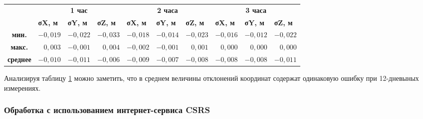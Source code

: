 \begin{table} [htbp]
	\centering\small
	\label{tab:tab08}{%
		\begin{tabular}{|c|rrr|rrr|rrr|}
			\hline
			\multirow{2}{*}{\textbf{ }} & 
			\multicolumn{3}{c|}{\textbf{1 час}}  & \multicolumn{3}{c|}{\textbf{2 часа}}  & \multicolumn{3}{c|}{\textbf{3 часа}}  \\ \cline{2-10} & 
			\multicolumn{1}{l|}{\textbf{σX, м}} & \multicolumn{1}{l|}{\textbf{σY, м}} & \multicolumn{1}{l|}{\textbf{σZ, м}} & \multicolumn{1}{l|}{\textbf{σX, м}} & \multicolumn{1}{l|}{\textbf{σY, м}} & \multicolumn{1}{l|}{\textbf{σZ, м}} & \multicolumn{1}{l|}{\textbf{σX, м}} & \multicolumn{1}{l|}{\textbf{σY, м}} & \multicolumn{1}{l|}{\textbf{σZ, м}} \\ \hline
			\textbf{мин.}                       & \multicolumn{1}{r|}{$-0,019$}       & \multicolumn{1}{r|}{$-0,022$}         & $-0,033$                            & \multicolumn{1}{r|}{$-0,018$}       & \multicolumn{1}{r|}{$-0,014$}         & $-0,023$                            & \multicolumn{1}{r|}{$-0,016$}       & \multicolumn{1}{r|}{$-0,012$}         & $-0,022$                              \\ \hline
			\textbf{макс.}                      & \multicolumn{1}{r|}{$0,003$}        & \multicolumn{1}{r|}{$-0,001$}         & $0,004$                             & \multicolumn{1}{r|}{$-0,002$}       & \multicolumn{1}{r|}{$-0,001$}         & $0,001$                             & \multicolumn{1}{r|}{$0,000$}        & \multicolumn{1}{r|}{$0,000$}          & $0,000$                              \\ \hline
			\textbf{среднее}                    & \multicolumn{1}{r|}{$-0,010$}       & \multicolumn{1}{r|}{$-0,011$}         & $-0,006$                            & \multicolumn{1}{r|}{$-0,009$}       & \multicolumn{1}{r|}{$-0,007$}         & $-0,008$                            & \multicolumn{1}{r|}{$-0,008$}       & \multicolumn{1}{r|}{$-0,008$}         & $-0,011$                              \\ \hline
		\end{tabular}
	}
\end{table}

Анализируя таблицу \cref{tab:tab08} можно заметить, что в среднем величины отклонений координат содержат одинаковую ошибку при 12-дневыных измерениях.




\subsubsection{Обработка с использованием интернет-сервиса CSRS }\label{subsec:ch2/sec3/sub1/sub2}


